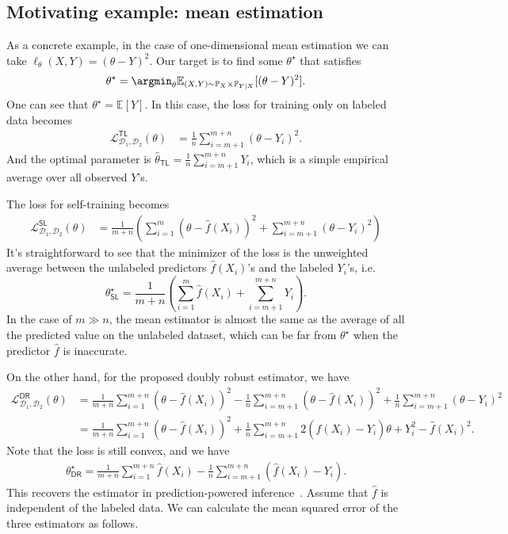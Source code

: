 \subsection{Motivating example: mean estimation}\label{sec:mean}
 As a concrete example, in the case of one-dimensional mean estimation  we can take $\ell_\theta(X, Y) = (\theta-Y)^2$. Our target is to find some $\theta^\star$ that satisfies
\begin{align*}
    \theta^\star = \argmin_{\theta} \mathbb{E}_{(X, Y)\sim \mathbb{P}_{X}\times \mathbb{P}_{Y|X}}[(\theta-Y)^2].
\end{align*}
One can   see that $\theta^\star = \mathbb{E}[Y]$. In this case, the loss for training only on labeled data  becomes
\begin{align*}
\mathcal{L}^{\mathsf{TL}}_{\mathcal{D}_1,\mathcal{D}_2}(\theta) & =   \frac{1}{n}    \sum_{i=m+1}^{m+n} (\theta- Y_i)^2.
\end{align*}
And the optimal parameter is $\hat \theta_{\mathsf{TL}} =  \frac{1}{n}\sum_{i=m+1}^{m+n} Y_i$, which is a simple empirical average over all observed $Y$'s.

The loss for  self-training  becomes
\begin{align*}
\mathcal{L}^{\mathsf{SL}}_{\mathcal{D}_1,\mathcal{D}_2}(\theta) & =   \frac{1}{m+n}  \left(\sum_{i=1}^m (\theta-\hat f(X_i))^2 + \sum_{i=m+1}^{m+n} (\theta- Y_i)^2\right)
\end{align*}
It's straightforward to see that the minimizer of the loss is the unweighted average between the unlabeled predictors $\hat f(X_i)$'s and the labeled $Y_i$'s, i.e.  $$\theta^\star_{\mathsf{SL}} = \frac{1}{m+n}\left(  \sum_{i=1}^m \hat f(X_i)+ \sum_{i=m+1}^{m+n} Y_i\right). $$
In the case of $m\gg n$, the mean estimator is almost the same as the average of all the predicted value on the unlabeled dataset, which can be far from $\theta^\star$ when the predictor $\hat f$ is inaccurate.


On the other hand, for the proposed doubly robust estimator, we have
\begin{align*}
\mathcal{L}^{\mathsf{DR}}_{\mathcal{D}_1,\mathcal{D}_2}(\theta) 
& = \frac{1}{m+n}  \sum_{i=1}^{m+n} (\theta- \hat f(X_i))^2 -  \frac{1}{n} \sum_{i=m+1}^{m+n} (\theta- \hat f(X_i))^2  + \frac{1}{n} \sum_{i=m+1}^{m+n} (\theta-  Y_i)^2  \\
& = \frac{1}{m+n}  \sum_{i=1}^{m+n} (\theta- \hat f(X_i))^2 + \frac{1}{n} \sum_{i=m+1}^{m+n} 2 (\hat f(X_i)-Y_i)\theta + Y_i^2 - \hat f(X_i)^2.
\end{align*}
Note that the loss is still convex, and we have
\begin{align*}  
\theta^\star_{\mathsf{DR}}= \frac{1}{m+n}  \sum_{i=1}^{m+n} \hat f(X_i) - \frac{1}{n}  \sum_{i=m+1}^{m+n} ( \hat f(X_i)-Y_i).
\end{align*}
This recovers the estimator in  prediction-powered inference~\citep{angelopoulos2023prediction}. Assume that $\hat f$ is independent of the labeled data. We can calculate the mean squared error of the three estimators as follows.


